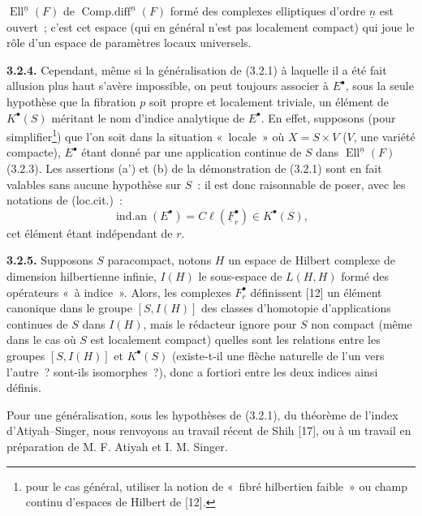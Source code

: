 $\operatorname{Ell}^{\underline n}(F)$ de
$\operatorname{Comp.diff}^{\underline n}(F)$ formé des complexes elliptiques d'ordre $\underline n$ est ouvert~; c'est cet espace (qui en général n'est pas localement compact) qui joue le rôle d'un espace de paramètres locaux universels.

\textbf{3.2.4.} Cependant, même si la généralisation de (3.2.1) à laquelle il a été fait allusion plus haut s'avère impossible, on peut toujours associer à $E^\bullet$, sous la seule hypothèse que la fibration $p$ soit propre et localement triviale, un élément de $K^\bullet(S)$ méritant le nom d'indice analytique de $E^\bullet$. En effet, supposons (pour simplifier\footnote{pour le cas général, utiliser la notion de «~fibré hilbertien faible~» ou champ continu d'espaces de Hilbert de [12].}) que l'on soit dans la situation «~locale~» où $X=S\times V$ ($V$, une variété compacte), $E^\bullet$ étant donné par une application continue de $S$ dans $\operatorname{Ell}^{\underline n}(F)$ (3.2.3). Les assertions (a') et (b) de la démonstration de (3.2.1) sont en fait valables sans aucune hypothèse sur $S$~: il est donc raisonnable de poser, avec les notations de (loc.cit.)~:
\[
  \operatorname{ind.an}(E^\bullet)=C\ell(\underline F_r^\bullet)\in K^\bullet(S),
\]
cet élément étant indépendant de $r$.

\textbf{3.2.5.} Supposons $S$ paracompact, notons $H$ un espace de Hilbert complexe de dimension hilbertienne infinie, $I(H)$ le sous-espace de $L(H,H)$ formé des opérateurs «~à indice~». Alors, les complexes $F_r^\bullet$ définissent [12] un élément canonique dans le groupe $[S,I(H)]$ des classes d'homotopie d'applications continues de $S$ dans $I(H)$, mais le rédacteur ignore pour $S$ non compact (même dans le cas où $S$ est localement compact) quelles sont les relations entre les groupes $[S,I(H)]$ et $K^\bullet(S)$ (existe-t-il une flèche naturelle de l'un vers l'autre~? sont-ils isomorphes~?), donc a fortiori entre les deux indices ainsi définis.

Pour une généralisation, sous les hypothèses de (3.2.1), du théorème de l'index d'Atiyah--Singer, nous renvoyons au travail récent de Shih [17], ou à un travail en préparation de M. F. Atiyah et I. M. Singer.

